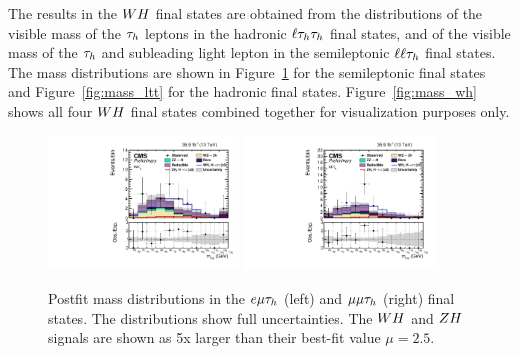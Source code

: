 The results in the $WH$ final states are obtained from the distributions of the 
visible mass of the $\tau_{h}$ leptons in the hadronic $\ell\tau_{h}\tau_{h}$ final states, 
and of the visible mass of the $\tau_{h}$ and subleading light lepton in the 
semileptonic $\ell\ell\tau_{h}$ final states. The mass distributions
are shown in Figure~\ref{fig:mass_llt} for the semileptonic final states 
and Figure~\ref{fig:mass_ltt} for the hadronic final states. 
Figure~\ref{fig:mass_wh} shows all four $WH$ final states combined together
for visualization purposes only.

\begin{figure}[h!]
 \begin{center}
  \includegraphics[width=0.45\textwidth]{higgs_to_taus_vh/plots/wh/emt_postfit.pdf}
  \includegraphics[width=0.45\textwidth]{higgs_to_taus_vh/plots/wh/mmt_postfit.pdf}
 \end{center}
 \caption{Postfit mass distributions in the $e\mu\tau_{h}$ (left) and 
 $\mu\mu\tau_{h}$ (right) final states.
 The distributions show full uncertainties.
 The $WH$ and $ZH$ signals are shown as 5x larger than their best-fit
 value $\mu = 2.5$.
 }
 \label{fig:mass_llt}
\end{figure}

